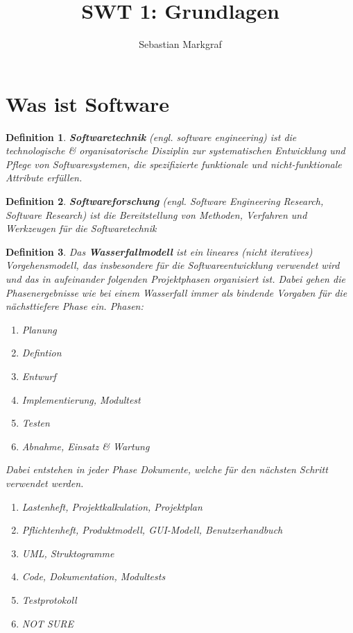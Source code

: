 \documentclass[a4paper]{article}
\title{SWT 1: Grundlagen}
\author{Sebastian Markgraf}
\theoremstyle{break}
\newtheorem{defi}{Definition}[section]
\begin{document}
\maketitle
\section {Was ist Software}
\begin {defi}
  \textbf{Softwaretechnik} (engl. software engineering) ist die technologische \& organisatorische Disziplin zur systematischen Entwicklung und Pflege von Softwaresystemen, die spezifizierte funktionale und nicht-funktionale Attribute erfüllen.
\end {defi}

\begin {defi}
  \textbf{Softwareforschung} (engl. Software Engineering Research, Software Research) ist die Bereitstellung von Methoden, Verfahren und Werkzeugen für die Softwaretechnik
\end {defi}


\begin {defi}
  Das \textbf{Wasserfallmodell} ist ein lineares (nicht iteratives) Vorgehensmodell, das insbesondere für die Softwareentwicklung verwendet wird und das in aufeinander folgenden Projektphasen organisiert ist. Dabei gehen die Phasenergebnisse wie bei einem Wasserfall immer als bindende Vorgaben für die nächsttiefere Phase ein.
  Phasen:
  \begin {enumerate}
  \item Planung
  \item Defintion
  \item Entwurf
  \item Implementierung, Modultest
  \item Testen
  \item Abnahme, Einsatz \& Wartung
  \end {enumerate}
  Dabei entstehen in jeder Phase Dokumente, welche für den nächsten Schritt verwendet werden.
  \begin {enumerate}
  \item Lastenheft, Projektkalkulation, Projektplan
  \item Pflichtenheft, Produktmodell, GUI-Modell, Benutzerhandbuch
  \item UML, Struktogramme
  \item Code, Dokumentation, Modultests
  \item Testprotokoll
  \item NOT SURE 
    \end {enumerate}
\end {defi}
\end{document}
